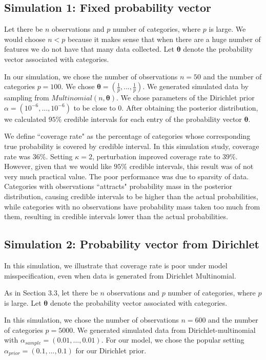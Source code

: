 \documentclass{article}
\begin{document}
\subsection{Simulation 1: Fixed probability vector}

Let there be $n$ observations and $p$ number of categories, where $p$ is large. We would choose $n < p$ because it makes sense that when there are a huge number of features we do not have that many data collected. Let $\boldsymbol{\theta}$ denote the probability vector associated with categories.

In our simulation, we chose the number of observations $n = 50$ and the number of categories $p = 100$. We chose $\boldsymbol{\theta} = (\frac{1}{p}, ..., \frac{1}{p})$. We generated simulated data by sampling from $Multinomial(n, \boldsymbol{\theta})$. We chose parameters of the Dirichlet prior $\alpha = (10^{-6}, ..., 10^{-6})$ to be close to $0$. After obtaining the posterior distribution, we calculated $95\%$ credible intervals for each entry of the probability vector $\boldsymbol{\theta}$. 

We define ``coverage rate" as the percentage of categories whose corresponding true probability is covered by credible interval. In this simulation study, coverage rate was $36\%$. Setting $\kappa = 2$, perturbation improved coverage rate to $39\%$. However, given that we would like $95\%$ credible intervals, this result was of not very much practical value. The poor performance was due to sparsity of data. Categories with observations ``attracts" probability mass in the posterior distribution, causing credible intervals to be higher than the actual probabilities, while categories with no observations have probability mass taken too much from them, resulting in credible intervals lower than the actual probabilities.

\subsection{Simulation 2: Probability vector from Dirichlet}

In this simulation, we illustrate that coverage rate is poor under model misspecification, even when data is generated from Dirichlet Multinomial.

As in Section 3.3, let there be $n$ observations and $p$ number of categories, where $p$ is large. Let $\boldsymbol{\theta}$ denote the probability vector associated with categories.

In this simulation, we chose the number of observations $n = 600$ and the number of categories $p = 5000$. We generated simulated data from Dirichlet-multinomial with $\alpha_{sample} = (0.01, ..., 0.01)$. For our model, we chose the popular setting $\alpha_{prior} = (0.1, ..., 0.1)$ for our Dirichlet prior.
\end{document}
